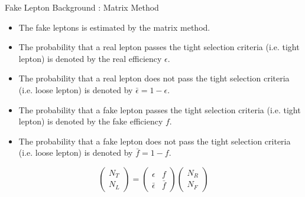 \documentclass[mathserif,serif]{beamer}
\begin{document}
\begin{frame}{Fake Lepton Background : Matrix Method}
\begin{itemize}
\item The fake leptons is estimated by the matrix method.
\item The probability that a real lepton passes the tight selection criteria (i.e. tight lepton) is denoted by the real efficiency $\epsilon$.
\item The probability that a real lepton does not pass the tight selection criteria (i.e. loose lepton) is denoted by $\bar{\epsilon} = 1 - \epsilon$.
\item The probability that a fake lepton passes the tight selection criteria (i.e. tight lepton) is denoted by the fake efficiency $f$.
\item The probability that a fake lepton does not pass the tight selection criteria (i.e. loose lepton) is denoted by $\bar{f} = 1 - f$.
\end{itemize}

\begin{equation*}
\left( \begin{array}{c}
N_T \\
N_L
\end{array} \right)
=
\left( \begin{array}{cc}
\epsilon & f \\
\bar{\epsilon} & \bar{f}
\end{array} \right)
\left( \begin{array}{c}
N_R \\
N_F
\end{array} \right)
\end{equation*}
\end{frame}
\end{document}
